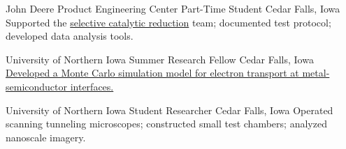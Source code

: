 		{John Deere Product Engineering Center}
		{Part-Time Student}
		{Cedar Falls, Iowa}{}
		{Supported the \href{https://www.deere.com/en/campaigns/engines-and-drivetrain/diesel-engine-technology}{selective catalytic reduction} team; documented test protocol; developed data analysis tools.}

		{University of Northern Iowa}
		{Summer Research Fellow}
		{Cedar Falls, Iowa}{}
		{\href{http://byron.tasseff.com/documents/reports/2010-ballistic_transport_at_metal_semiconductor_interfaces.pdf}{Developed a Monte Carlo simulation model for electron transport at metal-semiconductor interfaces.}}

		{University of Northern Iowa}
		{Student Researcher}
		{Cedar Falls, Iowa}{}
		{Operated scanning tunneling microscopes; constructed small test chambers; analyzed nanoscale imagery.}
